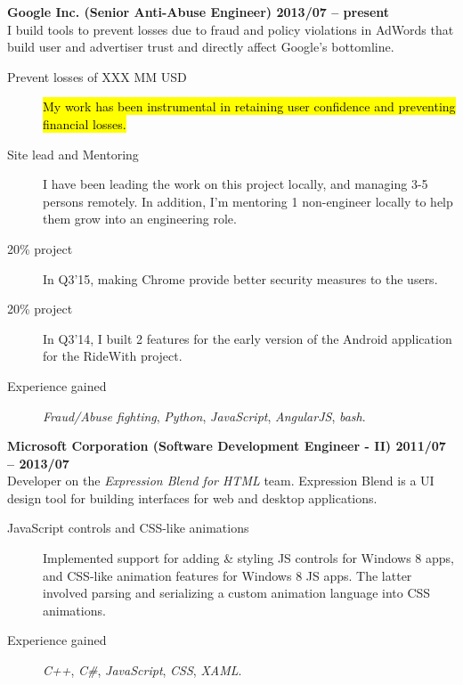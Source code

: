 \documentclass[margin,line]{resume}
\begin{document}
\begin{resume}
\textbf{Google Inc. \hfill (Senior Anti-Abuse Engineer) \hfill 2013/07 -- present}\\
I build tools to prevent losses due to fraud and policy violations in AdWords that build user and advertiser trust and directly affect Google's bottomline.
\begin{description}
\item [Prevent losses of XXX MM USD] \hl{My work has been instrumental in retaining user confidence and preventing financial losses.}
\item [Site lead and Mentoring] I have been leading the work on this project locally, and managing 3-5 persons remotely. In addition, I'm mentoring 1 non-engineer locally to help them grow into an engineering role.
\item [20\% project] In Q3'15, making Chrome provide better security measures to the users. 
\item [20\% project] In Q3'14, I built 2 features for the early version of the Android application for the RideWith project.
\item [Experience gained] \textit{Fraud/Abuse fighting}, \textit{Python}, \textit{JavaScript}, \textit{AngularJS}, \textit{bash}.
\end{description}
\hrulefill

\textbf{Microsoft Corporation \hfill (Software Development Engineer - II) \hfill 2011/07 -- 2013/07}\\%
Developer on the \textit{Expression Blend for HTML} team. Expression Blend is a UI design tool for building interfaces for web and desktop applications.
\begin{description}
\item [JavaScript controls and CSS-like animations] Implemented support for adding \& styling JS controls for Windows 8 apps, and CSS-like animation features for Windows 8 JS apps. The latter involved parsing and serializing a custom animation language into CSS animations.
\item [Experience gained] \textit{C++}, \textit{C\#}, \textit{JavaScript}, \textit{CSS}, \textit{XAML}.
\end{description}
\hrulefill


\end{resume}
\end{document}
